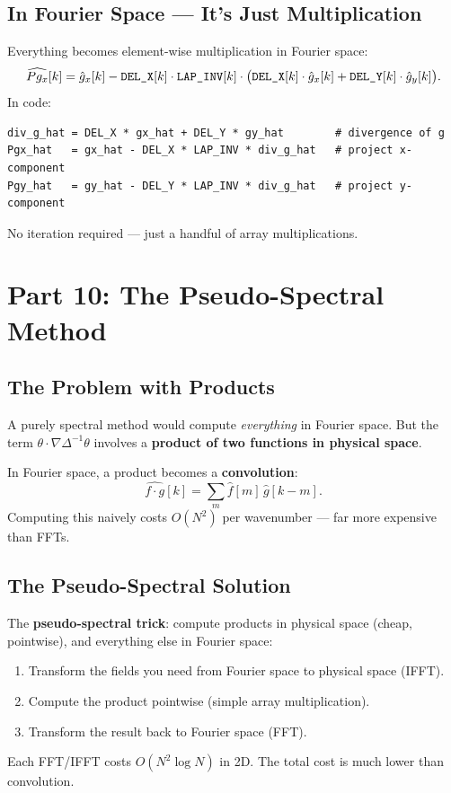 \documentclass[12pt,a4paper]{article}
\newcommand{\lapinv}{\Delta^{-1}}
\newcommand{\LAPINV}{\text{\texttt{LAP\_INV}}}
\newcommand{\DELX}{\text{\texttt{DEL\_X}}}
\newcommand{\DELY}{\text{\texttt{DEL\_Y}}}
\theoremstyle{definition}
\begin{document}
\subsection{In Fourier Space — It's Just Multiplication}

Everything becomes element-wise multiplication in Fourier space:
\begin{equation}
  \widehat{Pg_x}[k]
  = \hat g_x[k]
  - \DELX[k]\cdot\LAPINV[k]\cdot\bigl(\DELX[k]\cdot\hat g_x[k]
    + \DELY[k]\cdot\hat g_y[k]\bigr).
\end{equation}
In code:
\begin{lstlisting}
div_g_hat = DEL_X * gx_hat + DEL_Y * gy_hat        # divergence of g
Pgx_hat   = gx_hat - DEL_X * LAP_INV * div_g_hat   # project x-component
Pgy_hat   = gy_hat - DEL_Y * LAP_INV * div_g_hat   # project y-component
\end{lstlisting}
No iteration required — just a handful of array multiplications.

\section{Part 10: The Pseudo-Spectral Method}

\subsection{The Problem with Products}

A purely spectral method would compute \emph{everything} in Fourier space.
But the term $\theta\cdot\nabla\lapinv\theta$ involves a
\textbf{product of two functions in physical space}.

In Fourier space, a product becomes a \textbf{convolution}:
\[
  \widehat{f\cdot g}[k] = \sum_m \hat f[m]\,\hat g[k-m].
\]
Computing this naively costs $O(N^2)$ per wavenumber — far more expensive than
FFTs.

\subsection{The Pseudo-Spectral Solution}

The \textbf{pseudo-spectral trick}: compute products in physical space
(cheap, pointwise), and everything else in Fourier space:
\begin{enumerate}
  \item Transform the fields you need from Fourier space to physical space (IFFT).
  \item Compute the product pointwise (simple array multiplication).
  \item Transform the result back to Fourier space (FFT).
\end{enumerate}
Each FFT/IFFT costs $O(N^2\log N)$ in 2D.  The total cost is much lower than
convolution.
\end{document}
